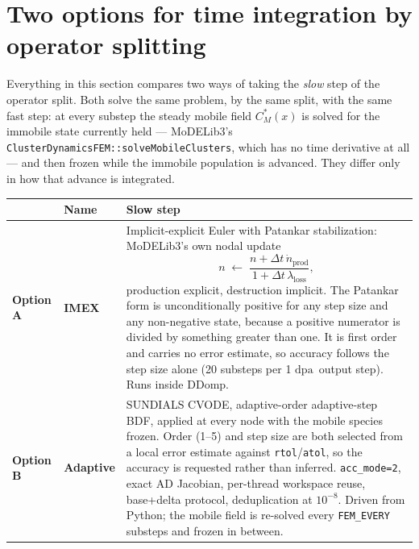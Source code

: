 \documentclass[11pt,a4paper]{article}
\newcommand{\code}[1]{\texttt{\small #1}}
\newcommand{\dpa}{\ensuremath{\mathrm{dpa}}}
\begin{document}
\section{Two options for time integration by operator splitting}
\label{sec:tworoute}

Everything in this section compares two ways of taking the \emph{slow} step of
the operator split. Both solve the same problem, by the same split, with the
same fast step: at every substep the steady mobile field $C_M^*(x)$ is solved
for the immobile state currently held --- MoDELib3's
\code{ClusterDynamicsFEM::solveMobileClusters}, which has no time derivative at
all --- and then frozen while the immobile population is advanced. They differ
only in how that advance is integrated.

\begin{center}
\begin{tabular}{llp{8.2cm}}
\toprule
 & Name & Slow step \\
\midrule
\textbf{Option A} & \textbf{IMEX} &
  Implicit-explicit Euler with Patankar stabilization: MoDELib3's own nodal
  update
  \[
     n \;\leftarrow\; \frac{n + \Delta t\,\dot n_{\mathrm{prod}}}
                           {1 + \Delta t\,\lambda_{\mathrm{loss}}},
  \]
  production explicit, destruction implicit. The Patankar form is
  unconditionally positive for any step size and any non-negative state,
  because a positive numerator is divided by something greater than one. It is
  first order and carries no error estimate, so accuracy follows the step size
  alone (20 substeps per 1 \dpa\ output step). Runs inside DDomp. \\[4pt]
\textbf{Option B} & \textbf{Adaptive} &
  SUNDIALS CVODE, adaptive-order adaptive-step BDF, applied at every node with
  the mobile species frozen. Order (1--5) and step size are both selected from
  a local error estimate against \code{rtol}/\code{atol}, so the accuracy is
  requested rather than inferred. \code{acc\_mode=2}, exact AD Jacobian,
  per-thread workspace reuse, base+delta protocol, deduplication at $10^{-8}$.
  Driven from Python; the mobile field is re-solved every \code{FEM\_EVERY}
  substeps and frozen in between. \\
\bottomrule
\end{tabular}
\end{center}
\end{document}
